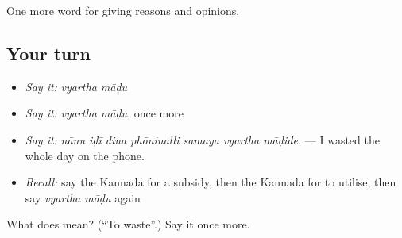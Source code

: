 \begin{grammarlens}[title={What you've built}]
One more word for giving reasons and opinions.
\end{grammarlens}

\subsection*{Your turn}
\begin{itemize}
\raggedright
  \item \emph{Say it:} \emph{vyartha māḍu}
  \item \emph{Say it:} \emph{vyartha māḍu}, once more
  \item \emph{Say it:} \emph{nānu iḍī dina phōninalli samaya vyartha māḍide.} — I wasted the whole day on the phone.
  \item \emph{Recall:} say the Kannada for a subsidy, then the Kannada for to utilise, then say \emph{vyartha māḍu} again
\end{itemize}

\begin{tcolorbox}[breakable,colback=teal!4,colframe=teal!35!black,title={Before you move on}]
What does   mean? (\textquotedblleft{}To waste\textquotedblright{}.) Say it once more.
\end{tcolorbox}

